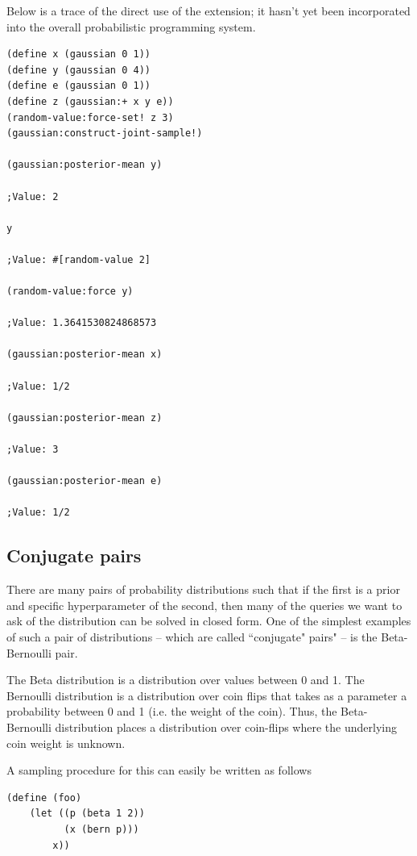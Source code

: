 \documentclass{article}
\begin{document}
Below is a trace of the direct use of the extension; it hasn't yet been
incorporated into the overall probabilistic programming system.

\begin{verbatim}
(define x (gaussian 0 1))
(define y (gaussian 0 4))
(define e (gaussian 0 1))
(define z (gaussian:+ x y e))
(random-value:force-set! z 3)
(gaussian:construct-joint-sample!)

(gaussian:posterior-mean y)

;Value: 2

y

;Value: #[random-value 2]

(random-value:force y)

;Value: 1.3641530824868573

(gaussian:posterior-mean x)

;Value: 1/2

(gaussian:posterior-mean z)

;Value: 3

(gaussian:posterior-mean e)

;Value: 1/2
\end{verbatim}


\subsection{Conjugate pairs}
There are many pairs of probability distributions such that if the first is a
prior and specific hyperparameter of the second, then many of the queries we
want to ask of the distribution can be solved in closed form. One of the
simplest examples of such a pair of distributions -- which are called
``conjugate" pairs" -- is the Beta-Bernoulli pair.


The Beta distribution is a distribution over values between 0 and 1. The
Bernoulli distribution is a distribution over coin flips that takes as a
parameter a probability between 0 and 1 (i.e. the weight of the coin). Thus,
the Beta-Bernoulli distribution places a distribution over coin-flips where
the underlying coin weight is unknown. 

A sampling procedure for this can easily be written as follows 

\begin{verbatim}
(define (foo)
    (let ((p (beta 1 2))
          (x (bern p)))
        x))
\end{verbatim}
\end{document}
